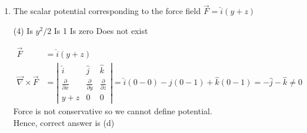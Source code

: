\begin{enumerate}
	 \begin{tasks}(4)
		\task[\textbf{a.}]$-40 \hat{k}$
		\task[\textbf{b.}]$-80 \hat{k}$
		\task[\textbf{c.}]$80 \hat{k}$
		\task[\textbf{d.}]  $40 \hat{k}$
	\end{tasks}
	\begin{answer}
		\begin{align*}
		\vec{r} &=5 \hat{i}-2 t^{2} \hat{j} \\
		\vec{v} &=\frac{d \vec{r}}{d t}=-4 t \hat{j} \\
		\vec{p} &=m \vec{v}=2(-4 t \hat{j})=-8 t \hat{j} \\
		\vec{L} &=\vec{r} \times \vec{p}=\left(5 \hat{i}-2 t^{2} \hat{j}\right) \times(-8 t \hat{j}) \\
		&=-40 t \hat{k}=-40 \times 2 \hat{k}=-80 \hat{k}
		\end{align*}
			Hence correct answer is (b)
	\end{answer}
	\item The scalar potential corresponding to the force field $\vec{F}=\hat{i}(y+z)$
	 \begin{tasks}(4)
		\task[\textbf{a.}]Is $y^{2} / 2$
		\task[\textbf{b.}] Is 1
		\task[\textbf{c.}]Is zero
		\task[\textbf{d.}] Does not exist
	\end{tasks}
	\begin{answer}
		\begin{align*}
		\vec{F} &=\hat{i}(y+z) \\
	\vec{\nabla} \times \vec{F}&=\left|\begin{array}{ccc}\hat{i} & \hat{j} & \hat{k} \\ \frac{\partial}{\partial x} & \frac{\partial}{\partial y} & \frac{\partial}{\partial z} \\ y+z & 0 & 0\end{array}\right|=\hat{i}(0-0)-\hat{j}(0-1)+\hat{k}(0-1)=-\hat{j}-\hat{k} \neq 0
		\end{align*}
			Force is not conservative so we cannot define potential. \\Hence, correct answer is (d)
	\end{answer}
\end{enumerate}
